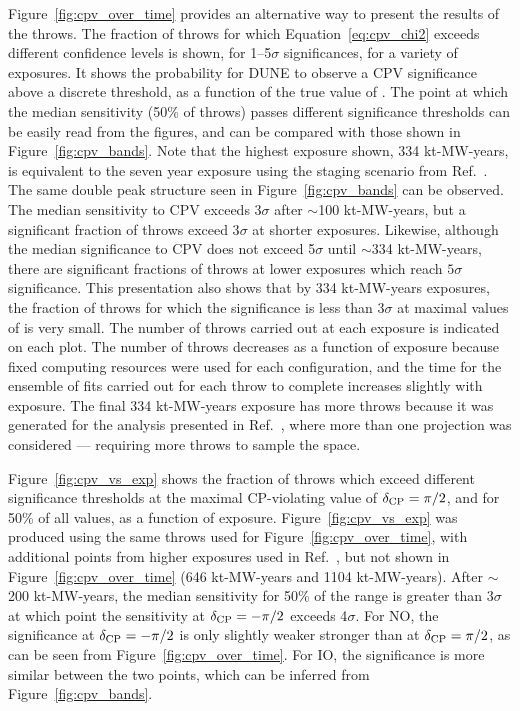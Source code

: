 Figure~\ref{fig:cpv_over_time} provides an alternative way to present the results of the throws. The fraction of throws for which Equation~\ref{eq:cpv_chi2} exceeds different confidence levels is shown, for 1--5$\sigma$ significances, for a variety of exposures. It shows the probability for DUNE to observe a CPV significance above a discrete threshold, as a function of the true value of \deltacp. The point at which the median sensitivity (50\% of throws) passes different significance thresholds can be easily read from the figures, and can be compared with those shown in Figure~\ref{fig:cpv_bands}. Note that the highest exposure shown, 334 kt-MW-years, is equivalent to the seven year exposure using the staging scenario from Ref.~\cite{Abi:2020qib}. The same double peak structure seen in Figure~\ref{fig:cpv_bands} can be observed. The median sensitivity to CPV exceeds 3$\sigma$ after $\sim$100 kt-MW-years, but a significant fraction of throws exceed 3$\sigma$ at shorter exposures. Likewise, although the median significance to CPV does not exceed 5$\sigma$ until $\sim$334 kt-MW-years, there are significant fractions of throws at lower exposures which reach $5\sigma$ significance. This presentation also shows that by 334 kt-MW-years exposures, the fraction of throws for which the significance is less than 3$\sigma$ at maximal values of \deltacp is very small. The number of throws carried out at each exposure is indicated on each plot. The number of throws decreases as a function of exposure because fixed computing resources were used for each configuration, and the time for the ensemble of fits carried out for each throw to complete increases slightly with exposure. The final 334 kt-MW-years exposure has more throws because it was generated for the analysis presented in Ref.~\cite{Abi:2020qib}, where more than one projection was considered --- requiring more throws to sample the space.

Figure~\ref{fig:cpv_vs_exp} shows the fraction of throws which exceed different significance thresholds at the maximal CP-violating value of $\delta_{\rm CP} = \pi/2$, and for 50\% of all \deltacp values, as a function of exposure. Figure~\ref{fig:cpv_vs_exp} was produced using the same throws used for Figure~\ref{fig:cpv_over_time}, with additional points from higher exposures used in Ref.~\cite{Abi:2020qib}, but not shown in Figure~\ref{fig:cpv_over_time} (646 kt-MW-years and 1104 kt-MW-years). After $\sim$200 kt-MW-years, the median sensitivity for 50\% of the \deltacp range is greater than 3$\sigma$ at which point the sensitivity at $\delta_{\rm CP} = -\pi/2$ exceeds 4$\sigma$. For NO, the significance at $\delta_{\rm CP} = -\pi/2$ is only slightly weaker stronger than at $\delta_{\rm CP} = \pi/2$, as can be seen from Figure~\ref{fig:cpv_over_time}. For IO, the significance is more similar between the two points, which can be inferred from Figure~\ref{fig:cpv_bands}.


